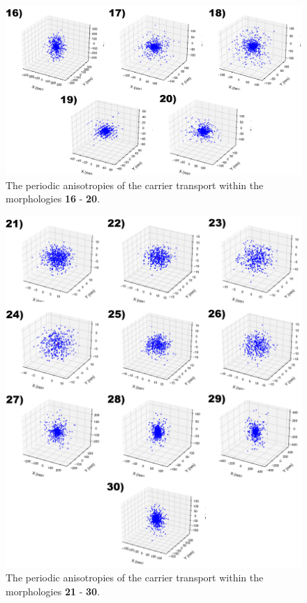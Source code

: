 \documentclass[12pt]{article}
\begin{document}
\begin{figure}[h!]\centering
	\includegraphics[width=\textwidth]{Figures/anisotropyHoleOrig.pdf}
    \caption{The periodic anisotropies of the carrier transport within the morphologies \textbf{16} - \textbf{20}.}
	\label{fig:AnisOrig}
\end{figure}

\begin{figure}[h!]\centering
	\includegraphics[width=\textwidth]{Figures/anisotropyHoleFrameOrig.png}
    \caption{The periodic anisotropies of the carrier transport within the morphologies \textbf{21} - \textbf{30}.}
	\label{fig:AnisFrameOrig}
\end{figure}
\end{document}
